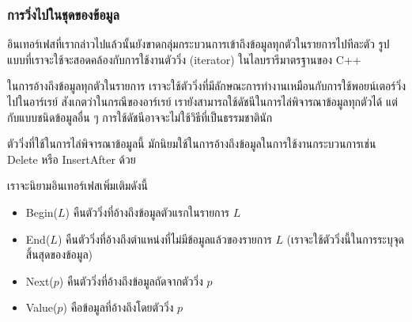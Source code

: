 \subsubsection{การ{\wbr}วิ่ง{\wbr}ไป{\wbr}ใน{\wbr}ชุด{\wbr}ของ{\wbr}ข้อมูล}

อิน{\wbr}เทอร์เฟส{\wbr}ที่{\wbr}เรา{\wbr}กล่าว{\wbr}ไป{\wbr}แล้ว{\wbr}นั้น{\wbr}ยัง{\wbr}ขาด{\wbr}กลุ่ม{\wbr}กระบวนการ{\wbr}เข้าถึง{\wbr}ข้อมูล{\wbr}ทุก{\wbr}ตัว{\wbr}ใน{\wbr}รายการ{\wbr}ไป{\wbr}ทีละ{\wbr}ตัว{\wbr}
รูปแบบ{\wbr}ที่{\wbr}เรา{\wbr}จะ{\wbr}ใช้{\wbr}จะ{\wbr}สอดคล้อง{\wbr}กับ{\wbr}การ{\wbr}ใช้{\wbr}งาน{\wbr}ตัว{\wbr}วิ่ง (iterator) ใน{\wbr}ไลบ{\wbr}รา{\wbr}รี{\wbr}มาตรฐาน{\wbr}ของ C++

ใน{\wbr}การ{\wbr}อ้าง{\wbr}ถึง{\wbr}ข้อมูล{\wbr}ทุก{\wbr}ตัว{\wbr}ใน{\wbr}รายการ{\wbr}
เรา{\wbr}จะ{\wbr}ใช้{\wbr}ตัว{\wbr}วิ่ง{\wbr}ที่{\wbr}มี{\wbr}ลักษณะ{\wbr}การ{\wbr}ทำงาน{\wbr}เหมือน{\wbr}กับ{\wbr}การ{\wbr}ใช้{\wbr}พอยน์เตอร์{\wbr}วิ่ง{\wbr}ไป{\wbr}ใน{\wbr}อาร์เรย์
สังเกต{\wbr}ว่า{\wbr}ใน{\wbr}กรณี{\wbr}ของ{\wbr}อาร์เรย์ เรา{\wbr}ยัง{\wbr}สามารถ{\wbr}ใช้{\wbr}ดัชนี{\wbr}ใน{\wbr}การ{\wbr}ไล่{\wbr}พิจารณา{\wbr}ข้อมูล{\wbr}ทุก{\wbr}ตัว{\wbr}ได้{\wbr}
แต่{\wbr}กับ{\wbr}แบบ{\wbr}ชนิด{\wbr}ข้อมูล{\wbr}อื่น ๆ การ{\wbr}ใช้{\wbr}ดัชนี{\wbr}อาจ{\wbr}จะ{\wbr}ไม่{\wbr}ใช้{\wbr}วิธี{\wbr}ที่{\wbr}เป็นธรรม{\wbr}ชาติ{\wbr}นัก{\wbr}

ตัว{\wbr}วิ่ง{\wbr}ที่{\wbr}ใช้{\wbr}ใน{\wbr}การ{\wbr}ไล่{\wbr}พิจารณา{\wbr}ข้อมูล{\wbr}นี้ มัก{\wbr}นิยม{\wbr}ใช้{\wbr}ใน{\wbr}การ{\wbr}อ้าง{\wbr}ถึง{\wbr}ข้อมูล{\wbr}ใน{\wbr}การ{\wbr}ใช้{\wbr}งาน{\wbr}กระบวนการ{\wbr}เช่น{\wbr}
Delete หรือ InsertAfter ด้วย{\wbr}

เรา{\wbr}จะ{\wbr}นิยาม{\wbr}อิน{\wbr}เทอร์เฟส{\wbr}เพิ่มเติม{\wbr}ดังนี้{\wbr}
\begin{itemize}
\item Begin($L$) คืนตัว{\wbr}วิ่ง{\wbr}ที่{\wbr}อ้าง{\wbr}ถึง{\wbr}ข้อมูล{\wbr}ตัว{\wbr}แรก{\wbr}ใน{\wbr}รายการ $L$
\item End($L$) คืนตัว{\wbr}วิ่ง{\wbr}ที่{\wbr}อ้าง{\wbr}ถึง{\wbr}ตำแหน่ง{\wbr}ที่{\wbr}ไม่{\wbr}มี{\wbr}ข้อมูล{\wbr}แล้ว{\wbr}ของ{\wbr}รายการ $L$
  (เรา{\wbr}จะ{\wbr}ใช้{\wbr}ตัว{\wbr}วิ่ง{\wbr}นี้{\wbr}ใน{\wbr}การ{\wbr}ระบุ{\wbr}จุดสิ้นสุด{\wbr}ของ{\wbr}ข้อมูล)
\item Next($p$) คืนตัว{\wbr}วิ่ง{\wbr}ที่{\wbr}อ้าง{\wbr}ถึง{\wbr}ข้อมูล{\wbr}ถัดจาก{\wbr}ตัว{\wbr}วิ่ง $p$
\item Value($p$) คือ{\wbr}ข้อมูล{\wbr}ที่{\wbr}อ้าง{\wbr}ถึง{\wbr}โดย{\wbr}ตัว{\wbr}วิ่ง $p$
\end{itemize}


